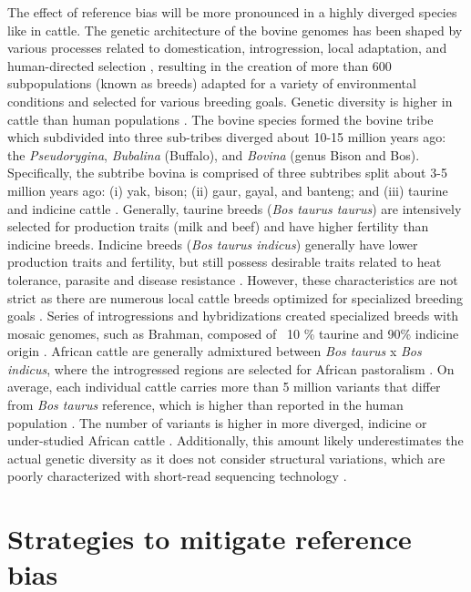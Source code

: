 \documentclass[../main.tex]{subfiles}
\begin{document}
The effect of reference bias will be more pronounced in a highly diverged species like in cattle. The genetic architecture of the bovine genomes has been shaped by various processes related to domestication, introgression, local adaptation, and human-directed selection \citep{zhang2020evolution}, resulting in the creation of more than 600 subpopulations (known as breeds) adapted for a variety of environmental conditions and selected for various breeding goals. Genetic diversity is higher in cattle than human populations \citep{charlier2016ngs}. The bovine species formed the bovine tribe which subdivided into three sub-tribes diverged about 10-15 million years ago: the \emph{Pseudorygina},\emph{ Bubalina} (Buffalo), and \emph{Bovina} (genus Bison and Bos). Specifically, the subtribe bovina is comprised of three subtribes split about 3-5 million years ago: (i) yak, bison; (ii) gaur,   gayal, and banteng; and (iii) taurine and indicine cattle \citep{pitt2019domestication}. Generally, taurine breeds (\emph{Bos taurus taurus}) are intensively selected for production traits (milk and beef) and have higher fertility than indicine breeds. Indicine breeds (\emph{Bos taurus indicus})  generally have lower production traits and fertility, but still possess desirable traits related to heat tolerance, parasite and disease resistance \citep{Low2020}. However, these characteristics are not strict as there are numerous local cattle breeds optimized for specialized breeding goals \citep{signer2017population,upadhyay2019genomic}. Series of introgressions and hybridizations created specialized breeds with mosaic genomes, such as Brahman, composed of ~10 \% taurine and 90\% indicine origin \citep{koufariotis2018sequencing}. African cattle are generally admixtured between \emph{Bos taurus} x \emph{Bos indicus}, where the introgressed regions are selected for African pastoralism \citep{kim2020mosaic}. On average, each individual cattle carries more than 5 million variants that differ from \emph{Bos taurus} reference, which is higher than reported in the human population \citep{daetwyler2014whole,sudmant2015integrated}. The number of variants is higher in more diverged, indicine \citep{koufariotis2018sequencing} or under-studied African cattle \citep{kim2020mosaic,kim2017genome}. Additionally, this amount likely underestimates the actual genetic diversity as it does not consider structural variations, which are poorly characterized with short-read sequencing technology \citep{mahmoud2019structural,chaisson2019multi}. 

\section{Strategies to mitigate reference bias}
\end{document}
